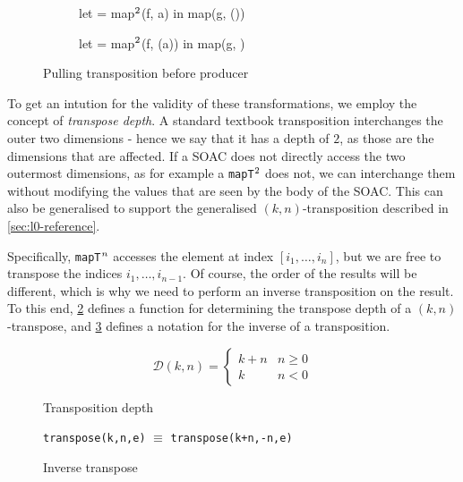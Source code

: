 \begin{figure}
\begin{subfigure}[t]{.5\textwidth}
\begin{colorcode}
let  = map\(^{2}\)(f, a) in
map(g, ())
\end{colorcode}
\end{subfigure}%
\begin{subfigure}[t]{.5\textwidth}
\begin{colorcode}
let  = map\(^{2}\)(f, (a)) in
map(g, )
\end{colorcode}
\end{subfigure}

\caption{Pulling transposition before producer}
\label{fig:pull-transpose}
\end{figure}

To get an intution for the validity of these transformations, we
employ the concept of \textit{transpose depth}.  A standard textbook
transposition interchanges the outer two dimensions - hence we say
that it has a depth of $2$, as those are the dimensions that are
affected.  If a SOAC does not directly access the two outermost
dimensions, as for example a \texttt{mapT$^{2}$} does not, we
can interchange them without modifying the values that are seen by the
body of the SOAC.  This can also be generalised to support the
generalised $(k,n)$-transposition described in \cref{sec:l0-reference}.

Specifically, \texttt{mapT$^{n}$} accesses the element at index
\([i_{1}, \ldots, i_{n}]\), but we are free to transpose the indices
$i_{1}, \ldots, i_{n-1}$.  Of course, the order of the results will be
different, which is why we need to perform an inverse transposition on
the result.  To this end, \cref{fig:depth-of-transpose} defines a
function for determining the transpose depth of a $(k,n)$-transpose,
and \cref{fig:inverse-transpose} defines a notation for the inverse of
a transposition.

\begin{figure}
\begin{center}
  \[
  \mathcal{D}(k,n) =
  \begin{cases}
    k+n & n \geq 0\\
    k   & n < 0
  \end{cases}
  \]
\end{center}
\caption{Transposition depth}
\label{fig:depth-of-transpose}
\end{figure}
\begin{figure}
\begin{center}
\texttt{transpose(k,n,e)} $\equiv$ \texttt{transpose(k+n,-n,e)}
\end{center}
\caption{Inverse transpose}
\label{fig:inverse-transpose}
\end{figure}

